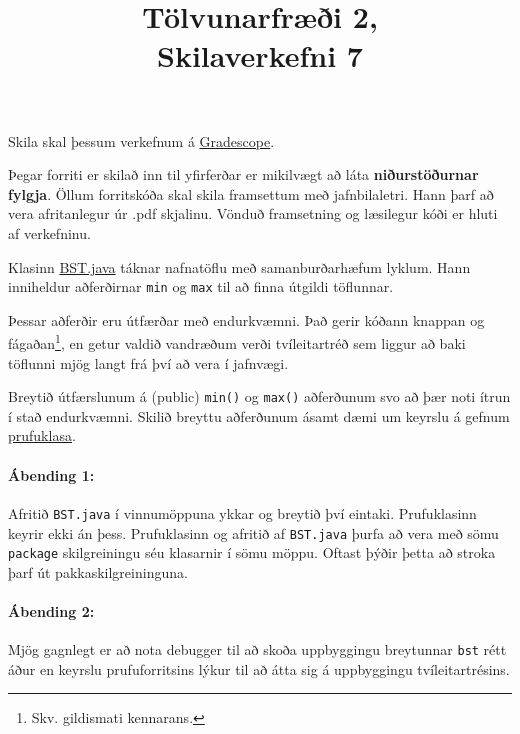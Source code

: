 \documentclass{article}
\title{Tölvunarfræði 2, \semester \\ Skilaverkefni 7}
\author{}
\begin{document}
\maketitle
{}

Skila skal þessum verkefnum á \href{https://gradescope.com/courses/14122}{Gradescope}.

Þegar forriti er skilað inn til yfirferðar er mikilvægt að láta \textbf{niðurstöðurnar fylgja}. Öllum forritskóða skal skila framsettum með jafnbilaletri. Hann þarf að vera afritanlegur úr .pdf skjalinu. Vönduð framsetning og læsilegur kóði er hluti af verkefninu.

\question

Klasinn \href{https://algs4.cs.princeton.edu/code/edu/princeton/cs/algs4/BST.java.html}{BST.java} táknar nafnatöflu með samanburðarhæfum lyklum. Hann inniheldur aðferðirnar \texttt{min} og \texttt{max} til að finna útgildi töflunnar.

Þessar aðferðir eru útfærðar með endurkvæmni. Það gerir kóðann knappan og fágaðan\footnote{Skv. gildismati kennarans.}, en getur valdið vandræðum verði tvíleitartréð sem liggur að baki töflunni mjög langt frá því að vera í jafnvægi.

Breytið útfærslunum á (public) \texttt{min()} og \texttt{max()} aðferðunum svo að þær noti ítrun í stað endurkvæmni. Skilið breyttu aðferðunum ásamt dæmi um keyrslu á gefnum \href{https://github.com/Ernir/kennsluefni/tree/master/T2/Code/w8/BSTTest.java}{prufuklasa}.

\paragraph{Ábending 1:} Afritið \texttt{BST.java} í vinnumöppuna ykkar og breytið því eintaki. Prufuklasinn keyrir ekki án þess. Prufuklasinn og afritið af \texttt{BST.java} þurfa að vera með sömu \texttt{package} skilgreiningu séu klasarnir í sömu möppu. Oftast þýðir þetta að stroka þarf út pakkaskilgreininguna.

\paragraph{Ábending 2:} Mjög gagnlegt er að nota debugger til að skoða uppbyggingu breytunnar \texttt{bst} rétt áður en keyrslu prufuforritsins lýkur til að átta sig á uppbyggingu tvíleitartrésins.

\newpage

\question
\end{document}
